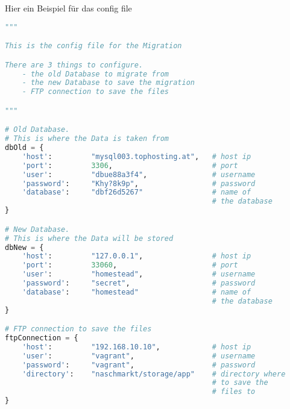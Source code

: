 Hier ein Beispiel f\"ur das config file
\\
\begin{lstlisting}[language={Python}, caption=config.py]
"""

This is the config file for the Migration

There are 3 things to configure.
    - the old Database to migrate from
    - the new Database to save the migration
    - FTP connection to save the files

"""

# Old Database.
# This is where the Data is taken from
dbOld = {
    'host':         "mysql003.tophosting.at",   # host ip
    'port':         3306,                       # port
    'user':         "dbue88a3f4",               # username
    'password':     "Khy?8k9p",                 # password
    'database':     "dbf26d5267"                # name of
                                                # the database
}

# New Database.
# This is where the Data will be stored
dbNew = {
    'host':         "127.0.0.1",                # host ip
    'port':         33060,                      # port
    'user':         "homestead",                # username
    'password':     "secret",                   # password
    'database':     "homestead"                 # name of
                                                # the database
}

# FTP connection to save the files
ftpConnection = {
    'host':         "192.168.10.10",            # host ip
    'user':         "vagrant",                  # username
    'password':     "vagrant",                  # password
    'directory':    "naschmarkt/storage/app"    # directory where
                                                # to save the
                                                # files to
}
\end{lstlisting}
